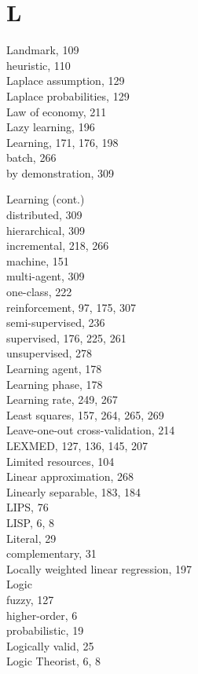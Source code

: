 \documentclass[10pt]{book}
\begin{document}
\section*{L}
Landmark, 109\\
heuristic, 110\\
Laplace assumption, 129\\
Laplace probabilities, 129\\
Law of economy, 211\\
Lazy learning, 196\\
Learning, 171, 176, 198\\
batch, 266\\
by demonstration, 309

Learning (cont.)\\

distributed, 309\\
hierarchical, 309\\
incremental, 218, 266\\
machine, 151\\
multi-agent, 309\\
one-class, 222\\
reinforcement, 97, 175, 307\\
semi-supervised, 236\\
supervised, 176, 225, 261\\
unsupervised, 278\\
Learning agent, 178\\
Learning phase, 178\\
Learning rate, 249, 267\\
Least squares, 157, 264, 265, 269\\
Leave-one-out cross-validation, 214\\
LEXMED, 127, 136, 145, 207\\
Limited resources, 104\\
Linear approximation, 268\\
Linearly separable, 183, 184\\
LIPS, 76\\
LISP, 6, 8\\
Literal, 29\\
complementary, 31\\
Locally weighted linear regression, 197\\
Logic\\
fuzzy, 127\\
higher-order, 6\\
probabilistic, 19\\
Logically valid, 25\\
Logic Theorist, 6, 8
\end{document}
